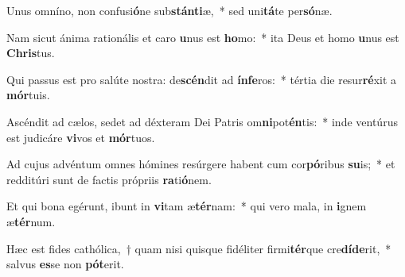 \item Unus omníno, non confusi\textbf{ó}ne sub\textbf{stán}\textbf{ti}æ,~* sed uni\textbf{tá}te per\textbf{só}næ.
\item Nam sicut ánima rationális et caro \textbf{u}nus est \textbf{ho}mo:~* ita Deus et homo \textbf{u}nus est \textbf{Chris}tus.
\item Qui passus est pro salúte nostra: de\textbf{scén}dit ad \textbf{ín}\textbf{fe}ros:~* tértia die resur\textbf{ré}xit a \textbf{mór}tuis.
\item Ascéndit ad cælos, sedet ad déxteram Dei Patris om\textbf{ni}pot\textbf{én}tis:~* inde ventúrus est judicáre \textbf{vi}vos et \textbf{mór}tuos.
\item Ad cujus advéntum omnes hómines resúrgere habent cum cor\textbf{pó}ribus \textbf{su}is;~* et redditúri sunt de factis própriis \textbf{ra}ti\textbf{ó}nem.
\item Et qui bona egérunt, ibunt in \textbf{vi}tam æ\textbf{tér}nam:~* qui vero mala, in \textbf{i}gnem æ\textbf{tér}num.
\item Hæc est fides cathólica,~† quam nisi quisque fidéliter firmi\textbf{tér}que cre\textbf{dí}\textbf{de}rit,~* salvus \textbf{es}se non \textbf{pót}erit.
